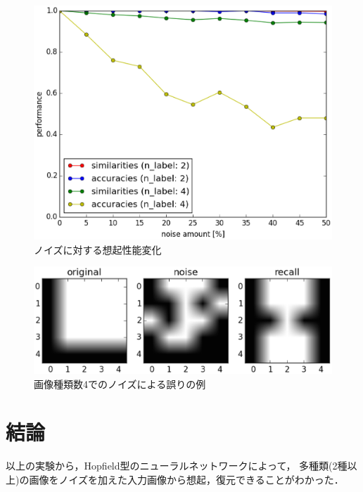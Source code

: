 \documentclass[10pt,twocolumn]{jarticle}
\begin{document}
\begin{figure}[hbtp]
  \centering
    \includegraphics[width=\columnwidth]{figs/noise_performance}
    \caption{ノイズに対する想起性能変化}
    \label{fig:noise-performance}
\end{figure}

\begin{figure}[hbtp]
  \centering
    \includegraphics[width=\columnwidth]{figs/noise_label4_wrong_sample}
    \caption{画像種類数4でのノイズによる誤りの例}
    \label{fig:noise-label4-wrong-sample}
\end{figure}


\section{結論}
以上の実験から，Hopfield型のニューラルネットワークによって，
多種類(2種以上)の画像をノイズを加えた入力画像から想起，復元できることがわかった．
\end{document}
